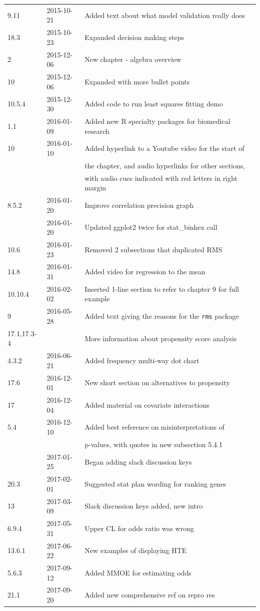 \documentclass{report}
\newcommand{\co}[1]{\texttt{\smaller #1}}
\begin{document}
\begin{center}
\begin{tabular}{lll}
9.11    & 2015-10-21 & Added text about what model validation really
                       does\\
18.3    & 2015-10-23 & Expanded decision making steps\\
2       & 2015-12-06 & New chapter - algebra overview\\
10      & 2015-12-06 & Expanded with more bullet points\\
10.5.4  & 2015-12-30 & Added code to run least squares fitting demo\\
1.1     & 2016-01-09 & Added new R specialty packages for biomedical research\\
10      & 2016-01-10 & Added hyperlink to a Youtube video for the start of\\
        &            & the chapter, and audio hyperlinks for other sections,\\
        &            & with audio cues indicated with red letters in
                       right margin\\
8.5.2   & 2016-01-20 & Improve correlation precision graph\\
        & 2016-01-20 & Updated ggplot2 twice for stat\_binhex call\\
10.6    & 2016-01-23 & Removed 2 subsections that duplicated RMS\\
14.8    & 2016-01-31 & Added video for regression to the mean\\
10.10.4 & 2016-02-02 & Inserted 1-line section to refer to chapter 9 for full example\\
9       & 2016-05-28 & Added text giving the reasons for the \co{rms} package\\
17.1,17.3-4    &            & More information about propensity score
                              analysis\\
4.3.2   & 2016-06-21 & Added frequency multi-way dot chart\\
17.6    & 2016-12-01 & New short section on alternatives to
                       propensity\\
17      & 2016-12-04 & Added material on covariate interactions\\
5.4     & 2016-12-10 & Added best reference on misinterpretations of\\
        &            & p-values, with quotes in new subsection 5.4.1\\
        & 2017-01-25 & Began adding slack discussion keys\\
20.3    & 2017-02-01 & Suggested stat plan wording for ranking genes\\
13      & 2017-03-09 & Slack discussion keys added, new intro \\
6.9.4   & 2017-05-31 & Upper CL for odds ratio was wrong \\
13.6.1  & 2017-06-22 & New examples of displaying HTE \\
5.6.3   & 2017-09-12 & Added MMOE for estimating odds \\
21.1    & 2017-09-20 & Added new comprehensive ref on repro res \\
\hline
\end{tabular}\end{center}
\else
\fi
\end{document}
